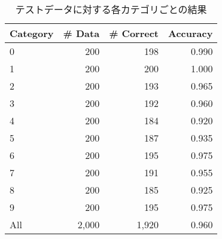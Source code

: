 \documentclass[class=jsarticle, crop=false, dvipdfmx, fleqn]{standalone}
\begin{document}
\begin{table}[H]
	\centering
	\caption{テストデータに対する各カテゴリごとの結果}
	\begin{tabular}{lrrr}
		Category & \# Data & \# Correct & Accuracy \\ \hline
		0 & 200 & 198 & 0.990 \\
		1 & 200 & 200 & 1.000 \\
		2 & 200 & 193 & 0.965 \\
		3 & 200 & 192 & 0.960 \\
		4 & 200 & 184 & 0.920 \\
		5 & 200 & 187 & 0.935 \\
		6 & 200 & 195 & 0.975 \\
		7 & 200 & 191 & 0.955 \\
		8 & 200 & 185 & 0.925 \\
		9 & 200 & 195 & 0.975 \\
		All & 2,000 & 1,920 & 0.960
	\end{tabular}
	\label{tab:result}
\end{table}
\end{document}
